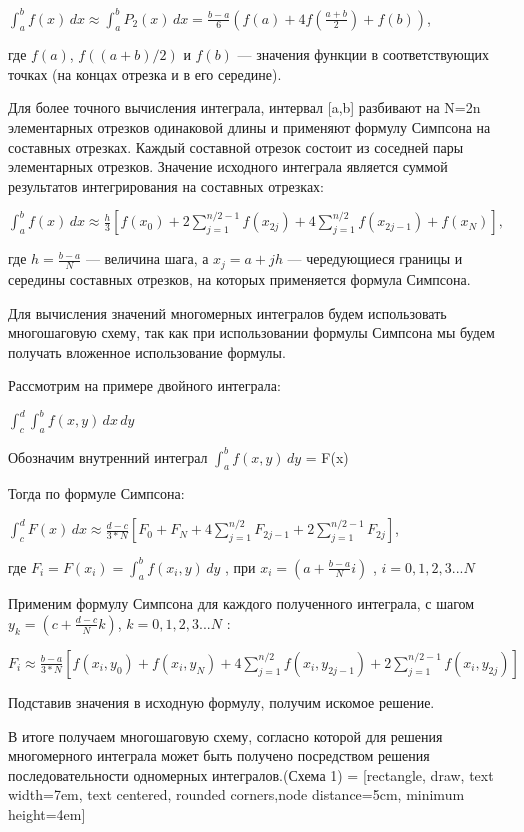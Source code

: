\documentclass{report}
\begin{document}
$\displaystyle {\int_{a}^{b} f(x) \, dx }\approx {\int_{a}^{b} P_{2}(x) \, dx}=\frac  {b-a}{6}{\left(f(a)+4f\left({\frac  {a+b}{2}}\right)+f(b)\right)}$,
\par где ${\displaystyle f(a)}$, ${\displaystyle f((a+b)/2)}$ и ${\displaystyle f(b)}$ — значения функции в соответствующих точках (на концах отрезка и в его середине).

\par Для более точного вычисления интеграла, интервал [a,b] разбивают на N=2n элементарных отрезков одинаковой длины и применяют формулу Симпсона на составных отрезках. Каждый составной отрезок состоит из соседней пары элементарных отрезков. Значение исходного интеграла является суммой результатов интегрирования на составных отрезках:

${\displaystyle \int _{a}^{b}f(x)\,dx\approx {\frac {h}{3}}\left[f(x_{0})+2\sum _{j=1}^{n/2-1}f(x_{2j})+4\sum _{j=1}^{n/2}f(x_{2j-1})+f(x_{N})\right],}$
\par где ${\displaystyle h={\frac {b-a}{N}}}$ — величина шага, а ${\displaystyle x_{j}=a+jh}$ — чередующиеся границы и середины составных отрезков, на которых применяется формула Симпсона.

\par Для вычисления значений многомерных интегралов будем использовать многошаговую схему, так как при использовании формулы Симпсона мы будем получать вложенное использование формулы. 

\par Рассмотрим на примере двойного интеграла:
\par $\displaystyle \int_{c}^{d} \int_{a}^{b} f(x,y) \,dx\,dy$
\par Обозначим внутренний интеграл $\displaystyle \int_{a}^{b} f(x,y) \, dy$ = F(x)
\par Тогда по формуле Симпсона:

\par $\displaystyle \int _{c}^{d} F(x) \,dx \approx \frac {d-c}{3*N} \left[ F_0+F_N+4\sum_{j=1}^{n/2}F_{2j-1}+2\sum _{j=1}^{n/2-1}F_{2j} \right]$,
\par где $\displaystyle F_i=F(x_i)= \int_{a}^{b} f(x_i,y) \, dy$ , при $\displaystyle x_i=(a+\frac{b-a}{N}i)$ , $i=0,1,2,3...N$
\par Применим формулу Симпсона для каждого полученного интеграла, с шагом $\displaystyle y_k=(c+\frac{d-c}{N}k)$, $k=0,1,2,3...N$ :
\par $\displaystyle F_i\approx\frac{b-a}{3*N}\left[f(x_i,y_0)+f(x_i,y_N)+4\sum_{j=1}^{n/2}f(x_i,y_{2j-1})+2\sum _{j=1}^{n/2-1}f(x_i,y_{2j})\right]$
\par Подставив значения в исходную формулу, получим искомое решение.  
\par В итоге получаем многошаговую схему, согласно которой для решения многомерного интеграла может быть получено посредством решения последовательности одномерных интегралов.(Схема 1)
 = [rectangle, draw, 
       text width=7em, text centered, rounded corners,node distance=5cm, minimum height=4em]
\end{document}
